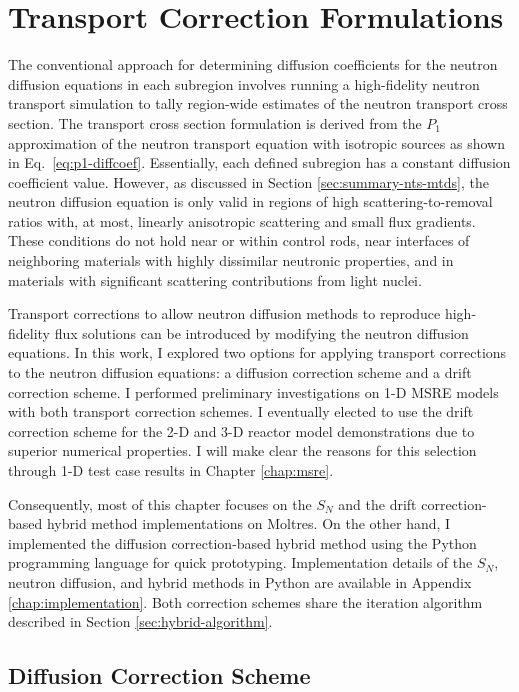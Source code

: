 \section{Transport Correction Formulations} \label{sec:transport-correction}

The conventional approach for determining diffusion coefficients for the neutron diffusion
equations in each subregion involves
running a high-fidelity neutron transport simulation to tally region-wide estimates of the neutron
transport cross section. The transport cross section formulation is derived from the $P_1$
approximation of the neutron transport equation with isotropic sources \cite{bell_nuclear_1970} as
shown in Eq.\ \ref{eq:p1-diffcoef}.
Essentially, each defined subregion has a constant diffusion coefficient value. However, as
discussed in Section \ref{sec:summary-nts-mtds}, the neutron diffusion
equation is only valid in regions of high scattering-to-removal ratios with, at most, linearly
anisotropic scattering and small flux gradients. These conditions do not hold near or within
control rods, near interfaces of neighboring materials with highly dissimilar neutronic properties,
and in materials with significant scattering contributions from light nuclei.

Transport corrections to allow neutron diffusion methods to reproduce high-fidelity flux solutions
can be introduced by modifying the neutron diffusion equations.
In this work, I explored two options for applying transport corrections to the neutron diffusion
equations: a diffusion correction scheme and a drift correction scheme.
I performed preliminary investigations on 1-D \gls{MSRE} models with both transport correction
schemes. I eventually elected to use the drift correction scheme for the 2-D and 3-D reactor model
demonstrations due to superior numerical properties. I will make clear the reasons for this
selection through 1-D test case results in Chapter \ref{chap:msre}.

Consequently, most of this chapter focuses on the $S_N$ and the drift correction-based hybrid
method implementations on Moltres. On the other hand, I implemented the diffusion correction-based
hybrid method using the Python programming language for quick
prototyping. Implementation details of the $S_N$, neutron diffusion, and hybrid methods in Python
are available in Appendix \ref{chap:implementation}. Both correction schemes share the iteration
algorithm described in Section \ref{sec:hybrid-algorithm}.

\subsection{Diffusion Correction Scheme} \label{sec:diffusion-correction}

